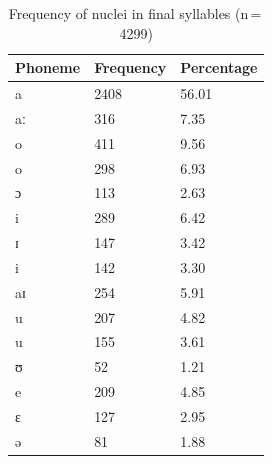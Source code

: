 \begin{table}[pth]\centering
\caption[Frequency of nuclei in final syllables]{Frequency of nuclei in final 
syllables (n\,=\,4299)}
\begin{tabu} to 0.5\linewidth{X X[c] X[c]}
\tableheaderfont\toprule
Phoneme
	& Frequency
	& Percentage
	\\
	
\toprule

a
	& 2408
	& 56.01\pct
	\\

aː
	& 316
	& 7.35\pct
	\\

\midrule

o
	& 411
	& 9.56\pct
	\\

\rowfont{\scriptsize\itshape}
\raggedleft
o
	& 298
	& 6.93\pct
	\\

\rowfont{\scriptsize\itshape}
\raggedleft
ɔ
	& 113
	& 2.63\pct
	\\

\midrule

i
	& 289
	& 6.42\pct
	\\

\rowfont{\scriptsize\itshape}
\raggedleft
ɪ
	& 147
	& 3.42\pct
	\\

\rowfont{\scriptsize\itshape}
\raggedleft
i
	& 142
	& 3.30\pct
	\\

\midrule

aɪ
	& 254
	& 5.91\pct
	\\

\midrule

u
	& 207
	& 4.82\pct
	\\

\rowfont{\scriptsize\itshape}
\raggedleft
u
	& 155
	& 3.61\pct
	\\

\rowfont{\scriptsize\itshape}
\raggedleft
ʊ
	& 52
	& 1.21\pct
	\\

\midrule

e
	& 209
	& 4.85\pct
	\\

\rowfont{\scriptsize\itshape}
\raggedleft
ɛ
	& 127
	& 2.95\pct
	\\

\rowfont{\scriptsize\itshape}
\raggedleft
ə
	& 81
	& 1.88\pct
	\\


\end{tabu}
\end{table}
